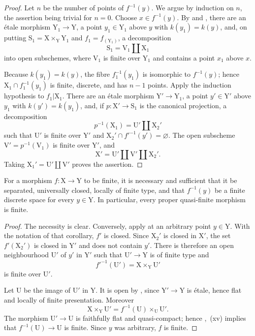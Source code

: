 \begin{proof}
Let $n$ be the number of points of $f^{-1}(y)$. We argue by induction on $n$, the assertion being trivial for $n=0$. Choose $x\in f^{-1}(y)$. By  and , there are an \'etale morphism $\mathrm{Y}_1\to\mathrm{Y}$, a point $y_1\in\mathrm{Y}_1$ above $y$ with $k(y_1)=k(y)$, and, on putting $\mathrm{S}_1=\mathrm{X}\times_{\mathrm{Y}}\mathrm{Y}_1$ and $f_1=f_{(\mathrm{Y}_1)}$, a decomposition
\[
  \mathrm{S}_1=\mathrm{V}_1\amalg\mathrm{X}_1
\]
into open subschemes, where $\mathrm{V}_1$ is finite over $\mathrm{Y}_1$ and contains a point $x_1$ above $x$.

Because $k(y_1)=k(y)$, the fibre $f_1^{-1}(y_1)$ is isomorphic to $f^{-1}(y)$; hence $\mathrm{X}_1\cap f_1^{-1}(y_1)$ is finite, discrete, and has $n-1$ points. Apply the induction hypothesis to $f_1|\mathrm{X}_1$. There are an \'etale morphism $\mathrm{Y}'\to\mathrm{Y}_1$, a point $y'\in\mathrm{Y}'$ above $y_1$ with $k(y')=k(y_1)$, and, if $p:\mathrm{X}'\to\mathrm{S}_1$ is the canonical projection, a decomposition
\[
  p^{-1}(\mathrm{X}_1)=\mathrm{U}'\amalg\mathrm{X}_2'
\]
such that $\mathrm{U}'$ is finite over $\mathrm{Y}'$ and $\mathrm{X}_2'\cap f'^{-1}(y')=\varnothing$. The open subscheme $\mathrm{V}'=p^{-1}(\mathrm{V}_1)$ is finite over $\mathrm{Y}'$, and
\[
  \mathrm{X}'=\mathrm{U}'\amalg\mathrm{V}'\amalg\mathrm{X}_2'.
\]
Taking $\mathrm{X}_1'=\mathrm{U}'\amalg\mathrm{V}'$ proves the assertion.
\end{proof}

\begin{corollary}[18.12.4]
\label{IV.18.12.4}
For a morphism $f:\mathrm{X}\to\mathrm{Y}$ to be finite, it is necessary and sufficient that it be separated, universally closed, locally of finite type, and that $f^{-1}(y)$ be a finite discrete space for every $y\in\mathrm{Y}$. In particular, every proper quasi-finite morphism is finite.
\end{corollary}

\begin{proof}
The necessity is clear. Conversely, apply  at an arbitrary point $y\in\mathrm{Y}$. With the notation of that corollary, $f'$ is closed. Since $\mathrm{X}_2'$ is closed in $\mathrm{X}'$, the set $f'(\mathrm{X}_2')$ is closed in $\mathrm{Y}'$ and does not contain $y'$. There is therefore an open neighbourhood $\mathrm{U}'$ of $y'$ in $\mathrm{Y}'$ such that $\mathrm{U}'\to\mathrm{Y}$ is of finite type and
\[
  f'^{-1}(\mathrm{U}')=\mathrm{X}\times_{\mathrm{Y}}\mathrm{U}'
\]
is finite over $\mathrm{U}'$.

Let $\mathrm{U}$ be the image of $\mathrm{U}'$ in $\mathrm{Y}$. It is open by , since $\mathrm{Y}'\to\mathrm{Y}$ is \'etale, hence flat and locally of finite presentation. Moreover
\[
  \mathrm{X}\times_{\mathrm{Y}}\mathrm{U}'
  =f^{-1}(\mathrm{U})\times_{\mathrm{U}}\mathrm{U}'.
\]
The morphism $\mathrm{U}'\to\mathrm{U}$ is faithfully flat and quasi-compact; hence ,~(xv) implies that $f^{-1}(\mathrm{U})\to\mathrm{U}$ is finite. Since $y$ was arbitrary, $f$ is finite.
\end{proof}

